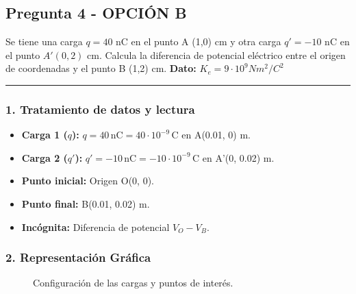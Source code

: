 \newpage

\subsection{Pregunta 4 - OPCIÓN B}
\label{subsec:4B_2008_sep_ext}

\begin{cajaenunciado}
Se tiene una carga $q=40$ nC en el punto A (1,0) cm y otra carga $q'=-10$ nC en el punto $A'(0,2)$ cm. Calcula la diferencia de potencial eléctrico entre el origen de coordenadas y el punto B (1,2) cm.
\textbf{Dato:} $K_{e}=9\cdot10^{9}Nm^{2}/C^{2}$
\end{cajaenunciado}
\hrule

\subsubsection*{1. Tratamiento de datos y lectura}
\begin{itemize}
    \item \textbf{Carga 1 ($q$):} $q = 40 \, \text{nC} = 40 \cdot 10^{-9} \, \text{C}$ en A(0.01, 0) m.
    \item \textbf{Carga 2 ($q'$):} $q' = -10 \, \text{nC} = -10 \cdot 10^{-9} \, \text{C}$ en A'(0, 0.02) m.
    \item \textbf{Punto inicial:} Origen O(0, 0).
    \item \textbf{Punto final:} B(0.01, 0.02) m.
    \item \textbf{Incógnita:} Diferencia de potencial $V_O - V_B$.
\end{itemize}

\subsubsection*{2. Representación Gráfica}
\begin{figure}[H]
    \centering
    \caption{Configuración de las cargas y puntos de interés.}
\end{figure}

